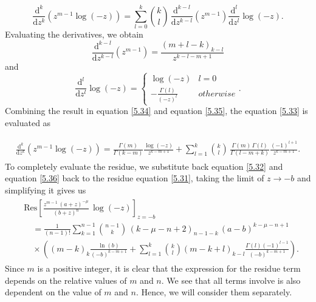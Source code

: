 \begin{equation}
    \frac{\mathrm{d}^{k}}{\mathrm{d}z^{k}} ( z^{m-1 }\log(-z)) = \sum_{l=0}^{k} {k \choose l} \,  \frac{\mathrm{d}^{k-l}}{\mathrm{d}z^{k-l}} (z^{m-1})  \frac{\mathrm{d}^{l}}{\mathrm{d}z^{l}} \log(-z).
    \label{5.33}
\end{equation}
Evaluating the derivatives, we obtain
\begin{equation}
     \frac{\mathrm{d}^{k-l}}{\mathrm{d}z^{k-l}} (z^{m-1}) = \frac{(m+l-k)_{k-l}}{z^{k-l-m+1}}
     \label{5.34}
\end{equation}
and
\begin{equation}
     \frac{\mathrm{d}^{l}}{\mathrm{d}z^{l}} \log(-z) =  \begin{cases} 
      \log(-z) & l = 0 \\
      -\frac{\Gamma(l)}{(-z)^{l}} & otherwise
   \end{cases}.
     \label{5.35}
\end{equation}
Combining the result in equation \eqref{5.34} and equation \eqref{5.35}, the equation \eqref{5.33} is evaluated as

\begin{align}
\begin{split}
\frac{\mathrm{d}^{k}}{\mathrm{d}z^{k}} ( z^{m-1 }\log(-z)) = \frac{\Gamma(m)}{\Gamma(k-m)} \frac{\log(-z)}{z^{k-m+1}} +\sum_{l=1}^{k} {k \choose l} \,  \frac{\Gamma(m) \, \Gamma(l)}{\Gamma(l-m+k)} \frac{(-1)^{l+1}}{z^{k-m+1}}.
\label{5.36}
\end{split}
\end{align}
To completely evaluate the residue, we substitute back equation \eqref{5.32} and equation \eqref{5.36} back to the residue equation \eqref{5.31}, taking the limit of $z \to -b$ and simplifying it gives us
\begin{align}
\begin{split}
    &\mathrm{Res} \left[\frac{z^{m-1} \, (a+z)^{-\mu}}{(b+z)^{n}}\, \log(-z) \right]_{z=-b} \\& \quad = \frac{1}{(n-1)!} \sum_{k=1}^{n-1} {n -1 \choose k} \, (k-\mu-n+2)_{n-1-k} \, (a-b)^{k-\mu-n+1} \\& \quad \times \left( (m-k)_{k} \frac{\ln(b)}{(-b)^{k-m+1}} + \sum_{l=1}^{k} {k \choose l} (m-k+l)_{k-l} \frac{\Gamma(l)  (-1)^{l-1}}{(-b)^{k-m+1}}  \right).
    \label{residue}
\end{split}
\end{align}
Since $m$ is a positive integer, it is clear that the expression for the residue term depends on the relative values of $m$ and $n$. We see that all terms involve is also dependent on the value of $m$ and $n$. Hence, we will consider them separately. 

